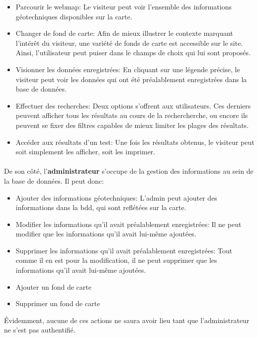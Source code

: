 \begin{itemize}
    \item Parcourir le webmap: Le visiteur peut voir l'ensemble des informations 
    géotechniques disponibles sur la carte.
    \item Changer de fond de carte: Afin de mieux illustrer le contexte marquant 
    l'intérêt du visiteur, une variété de fonds de carte est accessible sur le site. 
    Ainsi, l'utilisateur peut puiser dans le champs de choix qui lui sont proposés.
    \item Visionner les données enregistrées: En cliquant sur une légende précise, 
    le visiteur peut voir les données qui ont été préalablement enregistrées dans la base de données.
    \item Effectuer des recherches: Deux options s'offrent aux utilisateurs. Ces derniers 
    peuvent afficher tous les résultats au cours de la rechercherche, ou encore ils peuvent 
    se fixer des filtres capables de mieux limiter les plages des résultats.
    \item Accéder aux résultats d'un test: Une fois les résultats obtenus, le visiteur 
    peut soit simplement les afficher, soit les imprimer.
\end{itemize}

\paragraph{}
De son côté, l'\textbf{administrateur} s'occupe de la gestion des informations au sein de la base 
de données. Il peut donc:
\begin{itemize}
    \item Ajouter des informations géotechniques: L'admin peut ajouter des informations 
    dans la bdd, qui sont reflétées sur la carte. 
    \item Modifier les informations qu'il avait préalablement enregistrées: Il ne peut 
    modifier que les informations qu'il avait lui-même ajoutées.
    \item Supprimer les informations qu'il avait préalablement enregistrées: Tout comme il 
    en est pour la modification, il ne peut supprimer que les informations qu'il avait lui-même ajoutées.
    \item Ajouter un fond de carte
    \item Supprimer un fond de carte
\end{itemize}

\par 
Évidemment, aucune de ces actions ne saura avoir lieu tant que l'administrateur ne s'est pas authentifié.

